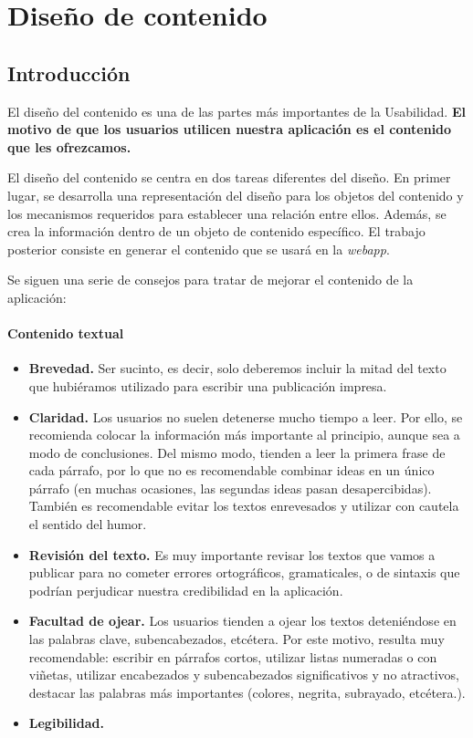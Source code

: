 

	\section{Diseño de contenido} %
	\label{sec:contenido}
	
	\subsection{Introducción} %
		\label{sub:cont_introduccion}
	
		El diseño del contenido es una de las partes más importantes de la Usabilidad. \textbf{El motivo de que los usuarios utilicen nuestra aplicación es el contenido que les ofrezcamos.}
		
		El diseño del contenido se centra en dos tareas diferentes del diseño. En primer lugar, se desarrolla una representación del diseño para los objetos del contenido y los mecanismos requeridos para establecer una relación entre ellos. Además, se crea la información dentro de un objeto de contenido específico. El trabajo posterior consiste en generar el contenido que se usará en la \textit{webapp}.
		
		Se siguen una serie de consejos para tratar de mejorar el contenido de la aplicación:
		\paragraph{Contenido textual} %
		\label{par:cont_contenido_textual}
			\begin{itemize}
				\item \textbf{Brevedad.} Ser sucinto, es decir, solo deberemos incluir la mitad del texto que hubiéramos utilizado para escribir una publicación impresa.
				\item \textbf{Claridad.} Los usuarios no suelen detenerse mucho tiempo a leer. Por ello, se recomienda colocar la información más importante al principio, aunque sea a modo de conclusiones. Del mismo modo, tienden a leer la primera frase de cada párrafo, por lo que no es recomendable combinar ideas en un único párrafo (en muchas ocasiones, las segundas ideas pasan desapercibidas). También es recomendable evitar los textos enrevesados y utilizar con cautela el sentido del humor.
				\item \textbf{Revisión del texto.} Es muy importante revisar los textos que vamos a publicar para no cometer errores ortográficos, gramaticales, o de sintaxis que podrían perjudicar nuestra credibilidad en la aplicación.
				\item \textbf{Facultad de ojear.} Los usuarios tienden a ojear los textos deteniéndose en las palabras clave, subencabezados, etcétera. Por este motivo, resulta muy recomendable: escribir en párrafos cortos, utilizar listas numeradas o con viñetas, utilizar encabezados y subencabezados significativos y no atractivos, destacar las palabras más importantes (colores, negrita, subrayado, etcétera.).
				\item \textbf{Legibilidad.} 
			\end{itemize}
		
